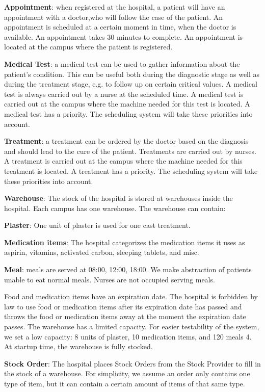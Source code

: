 \documentclass[a4paper]{article}
\begin{document}
\textbf{Appointment}: when registered at the hospital, a patient will have an appointment with a doctor,who will follow the case of the patient. An appointment is scheduled at a certain moment in time, when the doctor is available. An appointment takes 30 minutes to complete.{\color{red} An appointment is located at the campus where the patient is registered.}

\textbf{Medical Test}: a medical test can be used to gather information about the patient's condition. This can be useful both during the diagnostic stage as well as during the treatment stage, e.g. to follow up on certain critical values. A medical test is always carried out by a nurse at the scheduled time.{\color{red} A medical test is carried out at the campus where the machine needed for this test is located. A medical test has a priority.  The scheduling system will take these priorities into account.}

\textbf{Treatment}: a treatment can be ordered by the doctor based on the diagnosis and should lead to the cure of the patient. Treatments are carried out by nurses.{\color{red} A treatment is carried out at the campus where the machine needed for this treatment is located. A treatment has a priority.  The scheduling system will take these priorities into account.}

\textbf{Warehouse}: The stock of the hospital is stored at warehouses inside the hospital.{\color{red} Each campus has one warehouse}. The warehouse can contain:

\textbf{Plaster}: One unit of plaster is used for one cast treatment.

\textbf{Medication items}: The hospital categorizes the medication items it uses as aspirin, vitamins, activated carbon, sleeping tablets, and misc.

\textbf{Meal}: meals are served at 08:00, 12:00, 18:00. We make abstraction of patients unable to eat normal meals. Nurses are not occupied serving meals.

Food and medication items have an expiration date. The hospital is forbidden by law to use food or medication items after its expiration date has passed and throws the food or medication items away at the moment the expiration date passes.
The warehouse has a limited capacity. For easier testability of the system, we set a low capacity: 8 units of plaster, 10 medication items, and 120 meals 4. At startup time, the warehouse is fully stocked.

\textbf{Stock Order}: The hospital places Stock Orders from the Stock Provider to fill in the stock of {\color{red}a} warehouse. For simplicity, we assume an order only contains one type of item, but it can contain a certain amount of items of that same type.
\end{document}
